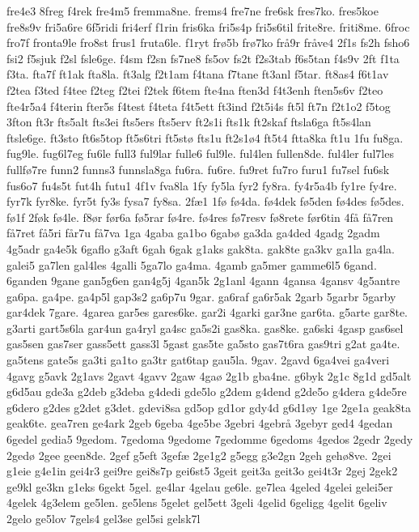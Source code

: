 {fre4e3
8freg
f4rek
fre4m5
fremma8ne.
frems4
fre7ne
fre6sk
fres7ko.
fres5koe
fre8s9v
fri5a6re
6f5ridi
fri4erf
f1rin
fris6ka
fri5s4p
fri5s6til
frite8re.
friti8me.
6froc
fro7f
fronta9le
fro8st
frus1
fruta6le.
f1ryt
frø5b
frø7ko
frå9r
fråve4
2f1s
fs2h
fsho6
fsi2
f5sjuk
f2sl
fsle6ge.
f4sm
f2sn
fs7ne8
fs5ov
fs2t
f2s3tab
f6s5tan
f4s9v
2ft
f1ta
f3ta.
fta7f
ft1ak
fta8la.
ft3alg
f2t1am
f4tana
f7tane
ft3anl
f5tar.
ft8as4
f6t1av
f2tea
f3ted
f4tee
f2teg
f2tei
f2tek
f6tem
fte4na
ften3d
f4t3enh
ften5s6v
f2teo
fte4r5a4
f4terin
fter5s
f4test
f4teta
f4t5ett
ft3ind
f2t5i4s
ft5l
ft7n
f2t1o2
f5tog
3fton
ft3r
fts5alt
fts3ei
fts5ers
fts5erv
ft2s1i
fts1k
ft2skaf
ftsla6ga
ft5s4lan
ftsle6ge.
ft3sto
ft6s5top
ft5s6tri
ft5stø
fts1u
ft2s1ø4
ft5t4
ftta8ka
ft1u
1fu
fu8ga.
fug9le.
fug6l7eg
fu6le
full3
ful9lar
fulle6
ful9le.
ful4len
fullen8de.
ful4ler
ful7les
fullfø7re
funn2
funns3
funnsla8ga
fu6ra.
fu6re.
fu9ret
fu7ro
furu1
fu7sel
fu6sk
fus6o7
fu4s5t
fut4h
futu1
4f1v
fva8la
1fy
fy5la
fyr2
fy8ra.
fy4r5a4b
fy1re
fy4re.
fyr7k
fyr8ke.
fyr5t
fy3s
fysa7
fy8sa.
2fæ1
1fø
fø4da.
fø4dek
fø5den
fø4des
fø5des.
fø1f
2føk
fø4le.
f8ør
før6a
fø5rar
fø4re.
fø4res
fø7resv
fø8rete
før6tin
4få
få7ren
få7ret
få5ri
får7u
få7va
1ga
4gaba
ga1bo
6gabø
ga3da
ga4ded
4gadg
2gadm
4g5adr
ga4e5k
6gaflo
g3aft
6gah
6gak
g1aks
gak8ta.
gak8te
ga3kv
ga1la
ga4la.
galei5
ga7len
gal4les
4galli
5ga7lo
ga4ma.
4gamb
ga5mer
gamme6l5
6gand.
6ganden
9gane
gan5g6en
gan4g5j
4gan5k
2g1anl
4gann
4gansa
4gansv
4g5antre
ga6pa.
ga4pe.
ga4p5l
gap3s2
ga6p7u
9gar.
ga6raf
ga6r5ak
2garb
5garbr
5garby
gar4dek
7gare.
4garea
gar5es
gares6ke.
gar2i
4garki
gar3ne
gar6ta.
g5arte
gar8te.
g3arti
gart5s6la
gar4un
ga4ryl
ga4sc
ga5s2i
gas8ka.
gas8ke.
ga6ski
4gasp
gas6sel
gas5sen
gas7ser
gass5ett
gass3l
5gast
gas5te
ga5sto
gas7t6ra
gas9tri
g2at
ga4te.
ga5tens
gate5s
ga3ti
ga1to
ga3tr
gat6tap
gau5la.
9gav.
2gavd
6ga4vei
ga4veri
4gavg
g5avk
2g1avs
2gavt
4gavv
2gaw
4gaø
2g1b
gba4ne.
g6byk
2g1c
8g1d
gd5alt
g6d5au
gde3a
g2deb
g3deba
g4dedi
gde5lo
g2dem
g4dend
g2de5o
g4dera
g4de5re
g6dero
g2des
g2det
g3det.
gdevi8sa
gd5op
gd1or
gdy4d
g6d1øy
1ge
2ge1a
geak8ta
geak6te.
gea7ren
ge4ark
2geb
6geba
4ge5be
3gebri
4gebrå
3gebyr
ged4
4gedan
6gedel
gedia5
9gedom.
7gedoma
9gedome
7gedomme
6gedoms
4gedos
2gedr
2gedy
2gedø
2gee
geen8de.
2gef
g5eft
3gefæ
2ge1g2
g5egg
g3e2gn
2geh
gehø8ve.
2gei
g1eie
g4e1in
gei4r3
gei9re
gei8s7p
gei6st5
3geit
geit3a
geit3o
gei4t3r
2gej
2gek2
ge9kl
ge3kn
g1eks
6gekt
5gel.
ge4lar
4gelau
ge6le.
ge7lea
4geled
4gelei
gelei5er
4gelek
4g3elem
ge5len.
ge5lens
5gelet
gel5ett
3geli
4gelid
6geligg
4gelit
6geliv
2gelo
ge5lov
7gels4
gel3se
gel5si
gelsk7l
}
